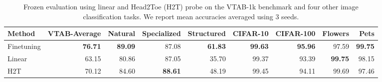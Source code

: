 \begin{table}[htbp]
    \centering
    \caption{Frozen evaluation using linear and Head2Toe (H2T) probe on the VTAB-1k benchmark and four other image classification tasks. We report mean accuracies averaged using 3 seeds.}
    \label{tab:h2t_vtab}
    \begin{tabular}{@{}lrrrrrrrr@{}}
    \toprule
    Method &  VTAB-Average &  Natural & Specialized &  Structured &  CIFAR-10 & CIFAR-100 &   Flowers  &      Pets   \\
    \midrule
    Finetuning   & \textbf{76.71} &  \textbf{89.09} & 87.08 & \textbf{61.83} & \textbf{99.63} &    \textbf{95.96} & 97.59  &  \textbf{99.75}\\
    Linear   & 63.15 &  80.86 & 87.05 & 35.70 &  99.37 &    93.39 &  \textbf{99.75} &  98.15 \\
    H2T & 70.12 &  84.60 & \textbf{88.61} & 48.19 &  99.45 &  94.11 &  99.69 &  97.46 \\
    \bottomrule
    \end{tabular}
%
 
\end{table}


